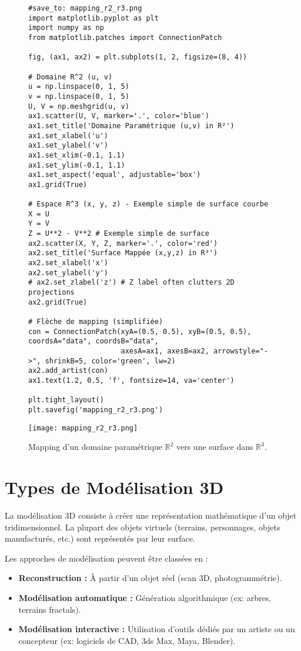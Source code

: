 \documentclass{article}
\begin{document}
\begin{figure}[H]
    \centering
    \begin{verbatim}
#save_to: mapping_r2_r3.png
import matplotlib.pyplot as plt
import numpy as np
from matplotlib.patches import ConnectionPatch

fig, (ax1, ax2) = plt.subplots(1, 2, figsize=(8, 4))

# Domaine R^2 (u, v)
u = np.linspace(0, 1, 5)
v = np.linspace(0, 1, 5)
U, V = np.meshgrid(u, v)
ax1.scatter(U, V, marker='.', color='blue')
ax1.set_title('Domaine Paramétrique (u,v) in R²')
ax1.set_xlabel('u')
ax1.set_ylabel('v')
ax1.set_xlim(-0.1, 1.1)
ax1.set_ylim(-0.1, 1.1)
ax1.set_aspect('equal', adjustable='box')
ax1.grid(True)

# Espace R^3 (x, y, z) - Exemple simple de surface courbe
X = U
Y = V
Z = U**2 - V**2 # Exemple simple de surface
ax2.scatter(X, Y, Z, marker='.', color='red')
ax2.set_title('Surface Mappée (x,y,z) in R³')
ax2.set_xlabel('x')
ax2.set_ylabel('y')
# ax2.set_zlabel('z') # Z label often clutters 2D projections
ax2.grid(True)

# Flèche de mapping (simplifiée)
con = ConnectionPatch(xyA=(0.5, 0.5), xyB=(0.5, 0.5), coordsA="data", coordsB="data",
                      axesA=ax1, axesB=ax2, arrowstyle="->", shrinkB=5, color='green', lw=2)
ax2.add_artist(con)
ax1.text(1.2, 0.5, 'f', fontsize=14, va='center')

plt.tight_layout()
plt.savefig('mapping_r2_r3.png')
    \end{verbatim}
    \texttt{[image: mapping\_r2\_r3.png]}
    \caption{Mapping d'un domaine paramétrique $\mathbb{R}^2$ vers une surface dans $\mathbb{R}^3$.}
    \label{fig:mapping_r2_r3}
\end{figure}

\section{Types de Modélisation 3D}

La modélisation 3D consiste à créer une représentation mathématique d'un objet tridimensionnel. La plupart des objets virtuels (terrains, personnages, objets manufacturés, etc.) sont représentés par leur surface.

Les approches de modélisation peuvent être classées en :
\begin{itemize}
    \item \textbf{Reconstruction :} À partir d'un objet réel (scan 3D, photogrammétrie).
    \item \textbf{Modélisation automatique :} Génération algorithmique (ex: arbres, terrains fractals).
    \item \textbf{Modélisation interactive :} Utilisation d'outils dédiés par un artiste ou un concepteur (ex: logiciels de CAD, 3ds Max, Maya, Blender).
\end{itemize}
\end{document}
